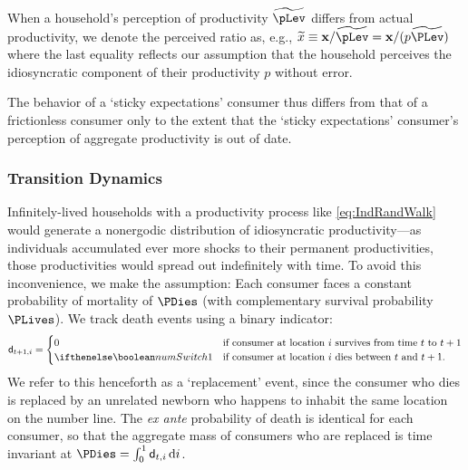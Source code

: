 \documentclass[titlepage]{\econtex}\newcommand{\texname}{cAndCwithStickyE}
\begin{document}
When a household's perception of productivity $\perc{\pLev}$ differs from actual productivity, we denote the perceived ratio as, e.g., $\perc{x} \equiv \mathbf{x}/\perc{\pLev} = \mathbf{x}/({p}\perc{\PLev})$ where the last equality reflects our assumption that the household perceives the idiosyncratic component of their productivity ${p}$ without error.

The behavior of a `sticky expectations' consumer thus differs from that of a frictionless consumer only to the extent that the `sticky expectations' consumer's perception of aggregate productivity is out of date.

\subsubsection{Transition Dynamics}

Infinitely-lived households with a productivity process like \eqref{eq:IndRandWalk} would generate a nonergodic distribution of idiosyncratic productivity---as individuals accumulated ever more shocks to their permanent productivities, those productivities would spread out indefinitely with time. To avoid this inconvenience, we make the \cite{blanchardFinite} assumption: Each consumer faces a constant probability of mortality of $\PDies$ (with complementary survival probability $\PLives$). 
We track death events using a binary indicator:
\begin{equation*}
\pDies_{t+1,i} =
  \begin{cases}
    0 & \text{if consumer at location $i$ survives from time $t$ to $t+1$}
\\ \ifnumSw  1 & \text{if consumer at location $i$ dies between $t$ and $t+1$}.
  \end{cases}
\end{equation*}
We refer to this henceforth as a `replacement' event, since the consumer who dies is replaced by an unrelated newborn who happens to inhabit the same location on the number line.  The {\it ex ante} probability of death is identical for each consumer, so that the aggregate mass of consumers who are replaced is time invariant at $\PDies = \int_{0}^{1} \pDies_{t,i}\,\text{d}i$.
\end{document}
